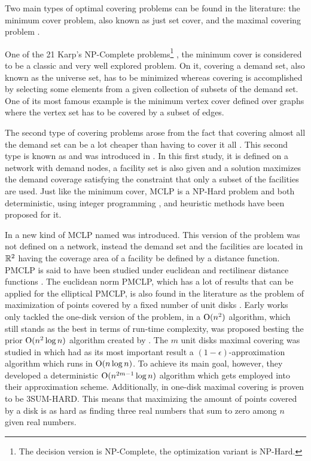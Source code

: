 Two main types of optimal covering problems can be found in the literature: the minimum cover problem, also known as just set cover, and the maximal covering problem \cite{karatas}. 

One of the 21 Karp's NP-Complete problems\footnote{The decision version is NP-Complete, the optimization variant is NP-Hard.} \cite{karp}, the minimum cover is considered to be a classic and very well explored problem. On it, covering a demand set, also known as the universe set, has to be minimized whereas covering is accomplished by selecting some elements from a given collection of subsets of the demand set. One of its most famous example is the minimum vertex cover defined over graphs where the vertex set has to be covered by a subset of edges.

The second type of covering problems arose from the fact that covering almost all the demand set can be a lot cheaper than having to cover it all \cite{garcia}. This second type is known as  and was introduced in \cite{church:1974}. In this first study, it is defined on a network with demand nodes, a facility set is also given and a solution maximizes the demand coverage satisfying the constraint that only a subset of the facilities are used. Just like the minimum cover, MCLP is a NP-Hard problem \cite{hatta:2013} and both deterministic, using integer programming \cite{church:1974}, and heuristic methods \cite{revelle:2008} have been proposed for it.

In \cite{church:1984} a new kind of MCLP named  was introduced. This version of the problem was not defined on a network, instead the demand set and the facilities are located in $\mathbb{R}^2$ having the coverage area of a facility be defined by a distance function. PMCLP is said to have been studied under euclidean and rectilinear distance functions \cite{younies}. The euclidean norm PMCLP, which has a lot of results that can be applied for the elliptical PMCLP, is also found in the literature as the problem of maximization of points covered by a fixed number of unit disks \cite{cabello:2006}. 
Early works only tackled the one-disk version of the problem, in \cite{chazelle:1986} a $\mathrm{O}(n^2)$ algorithm, which still stands as the best in terms of run-time complexity, was proposed besting the prior $\mathrm{O}(n^2\log{n})$ algorithm created by \cite{drezner}.
The $m$ unit disks maximal covering was studied in \cite{cabello:2006} which had as its most important result a $(1-\epsilon)$-approximation algorithm which runs in $\mathrm{O}(n\log{n})$. To achieve its main goal, however, they developed a deterministic $\mathrm{O}(n^{2m-1}\log{n})$ algorithm which gets employed into their approximation scheme.
Additionally, in \cite{aronov:2008} one-disk maximal covering is proven to be 3SUM-HARD. This means that maximizing the amount of points covered by a disk is as hard as finding three real numbers that sum to zero among $n$ given real numbers.

